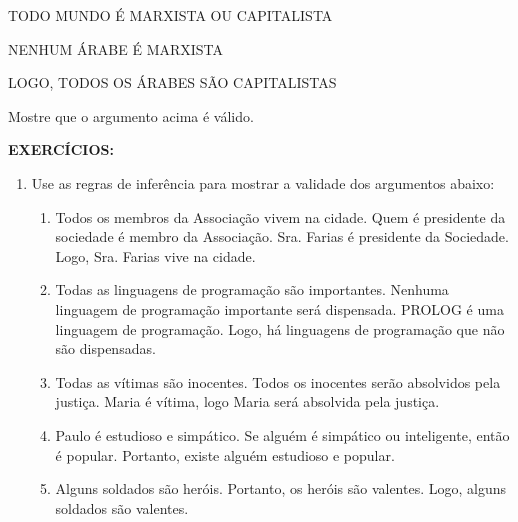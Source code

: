 \begin{exemplo}
    \leavevmode

    TODO MUNDO É MARXISTA OU CAPITALISTA

    NENHUM ÁRABE É MARXISTA

    LOGO, TODOS OS ÁRABES SÃO CAPITALISTAS
\end{exemplo}

\noindent Mostre que o argumento acima é válido.

\bigskip
\noindent \textbf{EXERCÍCIOS:}
\begin{enumerate}[label=\arabic*)]
    \item Use as regras de inferência para mostrar a validade dos argumentos abaixo:
    \begin{enumerate}[label=\alph*)]
        \item Todos os membros da Associação vivem na cidade. Quem é presidente da sociedade é membro da Associação. Sra. Farias é presidente da Sociedade. Logo, Sra. Farias vive na cidade.
        \item Todas as linguagens de programação são importantes. Nenhuma linguagem de programação importante será dispensada. PROLOG é uma linguagem de programação. Logo, há linguagens de programação que não são dispensadas.
        \item Todas as vítimas são inocentes. Todos os inocentes serão absolvidos pela justiça. Maria é vítima, logo Maria será absolvida pela justiça.
        \item Paulo é estudioso e simpático. Se alguém é simpático ou inteligente, então é popular. Portanto, existe alguém estudioso e popular.
        \item Alguns soldados são heróis. Portanto, os heróis são valentes. Logo, alguns soldados são valentes.
    \end{enumerate}
\end{enumerate}
